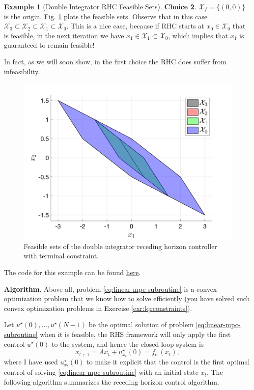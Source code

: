 \documentclass[
]{book}
\theoremstyle{definition}
\theoremstyle{definition}
\newtheorem{example}{Example}[chapter]
\theoremstyle{definition}
\theoremstyle{definition}
\theoremstyle{remark}
\begin{document}
\begin{example}[Double Integrator RHC Feasible Sets]
\textbf{Choice 2}. \(\mathcal{X}_f = \{(0,0)\}\) is the origin. Fig. \ref{fig:double-integrator-feasible-set-2} plots the feasible sets. Observe that in this case \(\mathcal{X}_3 \subset \mathcal{X}_2 \subset \mathcal{X}_1 \subset \mathcal{X}_0\). This is a nice case, because if RHC starts at \(x_0 \in \mathcal{X}_0\) that is feasible, in the next iteration we have \(x_1 \in \mathcal{X}_1 \subset \mathcal{X}_0\), which implies that \(x_1\) is guaranteed to remain feasible!

In fact, as we will soon show, in the first choice the RHC does suffer from infeasibility.

\begin{figure}

{\centering \includegraphics[width=0.6\linewidth]{images/double_integrator_feaset_2} 

}

\caption{Feasible sets of the double integrator receding horizon controller with terminal constraint.}\label{fig:double-integrator-feasible-set-2}
\end{figure}

The code for this example can be found \href{https://github.com/ComputationalRobotics/OptimalControlEstimation-Examples/blob/main/mpt_examples/double_integrator_feasible_sets.m}{here}.
\end{example}

\textbf{Algorithm}. Above all, problem \eqref{eq:linear-mpc-subroutine} is a convex optimization problem that we know how to solve efficiently (you have solved such convex optimization problems in Exercise \ref{exr:lqrconstraints}).

Let \(u^\star(0),\dots,u^\star(N-1)\) be the optimal solution of problem \eqref{eq:linear-mpc-subroutine} when it is feasible, the RHS framework will only apply the first control \(u^\star(0)\) to the system, and hence the closed-loop system is
\begin{equation}
x_{t+1} = A x_t + u^\star_{x_t}(0) = f_{\mathrm{cl}}(x_t),
\label{eq:mpc-closed-loop}
\end{equation}
where I have used \(u^\star_{x_t}(0)\) to make it explicit that the control is the first optimal control of solving \eqref{eq:linear-mpc-subroutine} with an initial state \(x_t\). The following algorithm summarizes the receding horizon control algorithm.
\end{document}
